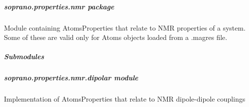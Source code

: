 \documentclass[letterpaper,10pt,english]{sphinxmanual}
\begin{document}
\begin{fulllineitems}

\begin{fulllineitems}
\label{doctree/soprano.properties.linkage.linkage:soprano.properties.linkage.linkage.Molecules.extract}
\end{fulllineitems}


\end{fulllineitems}



\subparagraph{soprano.properties.nmr package}
\label{doctree/soprano.properties.nmr:module-soprano.properties.nmr}\label{doctree/soprano.properties.nmr::doc}\label{doctree/soprano.properties.nmr:soprano-properties-nmr-package}
Module containing AtomsProperties that relate to NMR properties of a system.
Some of these are valid only for Atoms objects loaded from a .magres file.


\subparagraph{Submodules}
\label{doctree/soprano.properties.nmr:submodules}

\subparagraph{soprano.properties.nmr.dipolar module}
\label{doctree/soprano.properties.nmr.dipolar:module-soprano.properties.nmr.dipolar}\label{doctree/soprano.properties.nmr.dipolar::doc}\label{doctree/soprano.properties.nmr.dipolar:soprano-properties-nmr-dipolar-module}
Implementation of AtomsProperties that relate to NMR dipole-dipole
couplings
\end{document}
